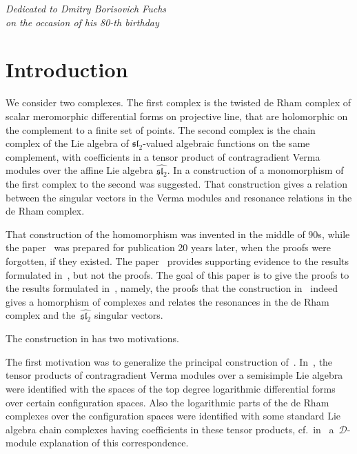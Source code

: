 \documentclass[pdftex]{sigma}
\numberwithin{equation}{section}
\begin{document}


\begin{flushright}
\begin{minipage}{65mm}
\it Dedicated to Dmitry Borisovich Fuchs\\ on the occasion of his 80-th birthday
\end{minipage}
\end{flushright}

\renewcommand{\thefootnote}{\arabic{footnote}}
\setcounter{footnote}{0}

\section{Introduction}

We consider two complexes. The first complex is the twisted de Rham complex of scalar meromorphic differential forms on projective line, that are holomorphic on the complement to a finite set of points. The second complex is the chain complex of the Lie algebra of $\mathfrak{sl}_2$-valued algebraic functions on the same complement, with coefficients in a tensor product of contragradient Verma modules over the affine Lie algebra $\widehat{{\mathfrak{sl}_2}}$. In \cite{SV2} a construction of a monomorphism of the first complex to the second was suggested. That construction gives a relation between the singular vectors in the Verma modules and resonance relations in the de Rham complex.

That construction of the homomorphism was invented in the middle of 90s, while the paper~\cite{SV2} was prepared for publication 20 years later, when the proofs were forgotten,
if they existed. The paper~\cite{SV2} provides supporting evidence to the results formulated in~\cite{SV2}, but not the proofs. The goal of this paper is to give the proofs to the results formulated in~\cite{SV2}, namely, the proofs that the construction in~\cite{SV2} indeed gives a homorphism of complexes and relates the resonances in the de Rham complex and the~$\widehat{{\mathfrak{sl}_2}}$ singular vectors.

The construction in \cite{SV2} has two motivations.

The first motivation was to generalize the principal construction of~\cite{SV1}. In~\cite{SV1}, the tensor products of contragradient Verma modules over a semisimple Lie algebra were identified with the spaces of the top degree logarithmic differential forms over certain configuration spaces. Also the logarithmic parts of the de Rham complexes over the configuration spaces were identified with some standard Lie algebra chain complexes having coefficients in these tensor products, cf.\ in~\cite{KS, KV} a~$\mathcal D$-module explanation of this correspondence.
\end{document}
